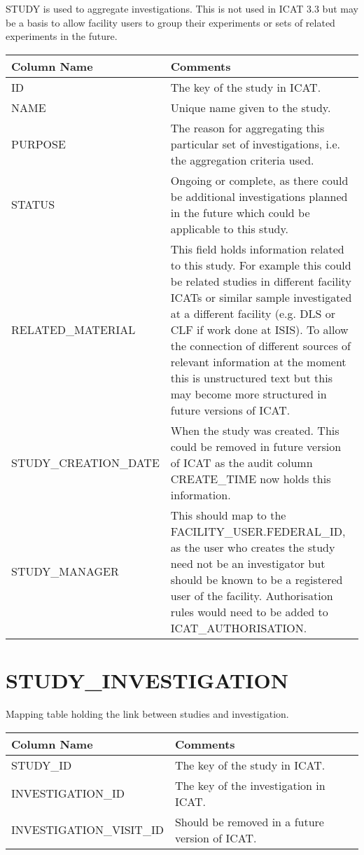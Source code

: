 \documentclass{report}
\begin{document}
STUDY is used to aggregate investigations. This is not used in ICAT 3.3 but may be a basis to allow facility users to group their experiments or sets of related experiments in the future.\\

\begin{tabular}{|l|l|}
\hline
Column Name & Comments \\ \hline
ID & \multicolumn{1}{p{100mm}|}{
The key of the study in ICAT.} \\ \hline
NAME & \multicolumn{1}{p{100mm}|}{
Unique name given to the study.} \\ \hline
PURPOSE & \multicolumn{1}{p{100mm}|}{
The reason for aggregating this particular set of investigations, i.e. the aggregation criteria used.} \\ \hline
STATUS & \multicolumn{1}{p{100mm}|}{
Ongoing or complete, as there could be additional investigations planned in the future which could be applicable to this study.} \\ \hline
RELATED\_MATERIAL & \multicolumn{1}{p{100mm}|}{
This field holds information related to this study. For example this could be related studies in different facility ICATs or similar sample investigated at a different facility (e.g. DLS or CLF if work done at ISIS). To allow the connection of different sources of relevant information  at the moment this is unstructured text but this may become more structured in future versions of ICAT.} \\ \hline
STUDY\_CREATION\_DATE & \multicolumn{1}{p{100mm}|}{
When the study was created. This could be removed in future version of ICAT as the audit column CREATE\_TIME now holds this information.} \\ \hline
STUDY\_MANAGER & \multicolumn{1}{p{100mm}|}{
This should map to the FACILITY\_USER.FEDERAL\_ID, as the user who creates the study need not be an investigator but should be known to be a registered user of the facility. Authorisation rules would need to be added to ICAT\_AUTHORISATION.} \\ \hline
\end{tabular}
\section{STUDY\_INVESTIGATION}

Mapping table holding the link between studies and investigation.\\

\begin{tabular}{|l|l|}
\hline
Column Name & Comments \\ \hline
STUDY\_ID & \multicolumn{1}{p{100mm}|}{
The key of the study in ICAT.} \\ \hline
INVESTIGATION\_ID & \multicolumn{1}{p{100mm}|}{
The key of the investigation in ICAT.} \\ \hline
INVESTIGATION\_VISIT\_ID & \multicolumn{1}{p{100mm}|}{
Should be removed in a future version of ICAT.} \\ \hline
\end{tabular}
\end{document}
